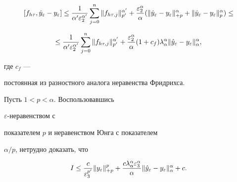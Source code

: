 \begin{pf}
$$


[ f_{h\tau}, \Hat{y}_\varepsilon-y_\varepsilon ]


\le \frac{1}{\alpha '\varepsilon ^{\alpha '}_{2}  }


\sum^{n}_{j=0}\|  f_{h\tau,j} \|


^{\alpha '}_{p'}+


\frac{ \varepsilon ^{\alpha}_{2}  }{\alpha } (


\| \Hat{y}_\varepsilon-y_\varepsilon \| ^{\alpha}_{+p}+ 


\| \Hat{y}_\varepsilon-y_\varepsilon \| ^{\alpha }_{p}) \le


$$


\begin{equation}


\le \frac{1}{\alpha '\varepsilon ^{\alpha '}_{2}  }


\sum^{n}_{j=0}\|  f_{h\tau,j}


\| ^{\alpha '}_{p'}+


\frac{\varepsilon^{\alpha}_2 }{\alpha}(1 +c_f)


\lambda ^{\alpha }_{\alpha }


\| \Hat{y}_\varepsilon


- y_\varepsilon \| ^{\alpha }_{\alpha }, \label{5.27}


\end{equation}


где $c_{f} $ ---


постоянная из разностного аналога неравенства  Фридрихса.





Пусть $1 < p < \alpha $. Воспользовавшись


$\varepsilon$-неравенством с


показателем $p$ и неравенством Юнга с показателем


$\alpha/p$, нетрудно доказать, что


\begin{equation}


I \le


\frac{c}{\varepsilon^{p'}_3 }


\|  y_\varepsilon \| ^{p}_{+p} +


 \frac{c


\lambda^{\alpha}_{\alpha}\varepsilon^\alpha_3}{\alpha }


 \| \Hat{y}_\varepsilon - y_\varepsilon


 \| ^{\alpha }_{\alpha } + c. \label{5.31}



\end{equation}
\end{pf}
